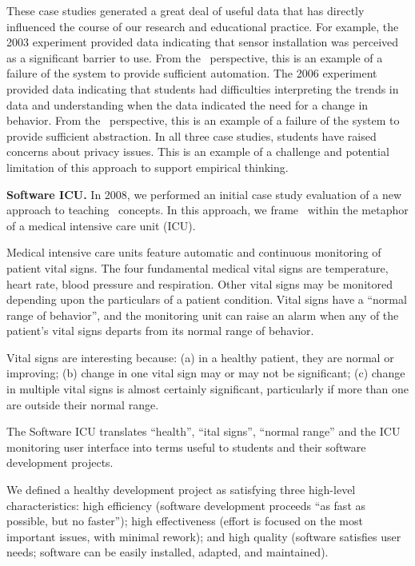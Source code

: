 These case studies generated a great deal of useful data that has directly
influenced the course of our research and educational practice. For
example, the 2003 experiment provided data indicating that sensor
installation was perceived as a significant barrier to use. From the \eCT\
perspective, this is an example of a failure of the system to provide
sufficient automation.  The 2006 experiment provided data indicating that
students had difficulties interpreting the trends in data and understanding
when the data indicated the need for a change in behavior.  From the \eCT\
perspective, this is an example of a failure of the system to provide
sufficient abstraction.  In all three case studies, students have raised
concerns about privacy issues.  This is an example of a challenge and
potential limitation of this approach to support empirical thinking.

{\bf Software ICU.}  In 2008, we performed an initial case study evaluation 
of a new approach to teaching \eCT\ concepts.  In this approach, we frame 
\eCT\ within the metaphor of a medical intensive care unit (ICU). 

Medical intensive care units feature automatic and continuous monitoring of
patient vital signs.  The four fundamental medical vital signs are
temperature, heart rate, blood pressure and respiration.  Other vital signs
may be monitored depending upon the particulars of a patient condition.
Vital signs have a ``normal range of behavior'', and the monitoring unit
can raise an alarm when any of the patient's vital signs departs from its
normal range of behavior.

Vital signs are interesting because: (a) in a healthy patient, they are
normal or improving; (b) change in one vital sign may or may not be
significant; (c) change in multiple vital signs is almost certainly
significant, particularly if more than one are outside their normal range.

The Software ICU translates ``health'', ``ital signs'', ``normal range''
and the ICU monitoring user interface into terms useful to students and their
software development projects.

We defined a healthy development project as satisfying three high-level
characteristics: high efficiency (software development proceeds ``as fast
as possible, but no faster''); high effectiveness (effort is focused on the
most important issues, with minimal rework); and high quality (software
satisfies user needs; software can be easily installed, adapted, and
maintained).

